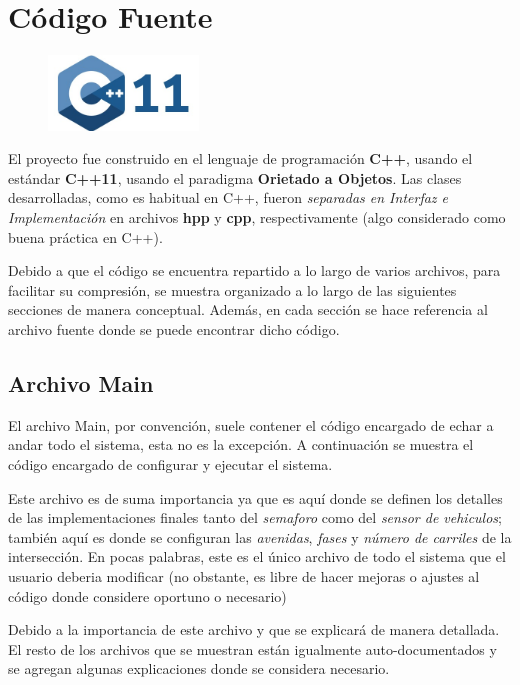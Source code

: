 \documentclass[letterpaper,12pt,openany,oneside]{book}
\begin{document}
\chapter{Código Fuente}\label{chapter:codigofuente}
\begin{figure}
	\includegraphics[width=4cm]{logo_cpp11.jpg}
\end{figure}
El proyecto fue construido en el lenguaje de programación \textbf{C++}, usando el estándar \textbf{C++11}, usando el paradigma \textbf{Orietado a Objetos}. Las clases desarrolladas, como es habitual en C++, fueron \emph{separadas en Interfaz e Implementación} en archivos \textbf{hpp} y \textbf{cpp}, respectivamente (algo considerado como buena práctica en C++).

Debido a que el código se encuentra repartido a lo largo de varios archivos, para facilitar su compresión, se muestra organizado a lo largo de las siguientes secciones de manera conceptual. Además, en cada sección se hace referencia al archivo fuente donde se puede encontrar dicho código.

\section{Archivo Main}
El archivo Main, por convención, suele contener el código encargado de echar a andar todo el sistema, esta no es la excepción. A continuación se muestra el código encargado de configurar y ejecutar el sistema.

Este archivo es de suma importancia ya que es aquí donde se definen los detalles de las implementaciones finales tanto del \emph{semaforo} como del \emph{sensor de vehiculos}; también aquí es donde se configuran las \textit{avenidas}, \textit{fases} y \textit{número de carriles} de la intersección. En pocas palabras, este es el único archivo de todo el sistema que el usuario deberia modificar (no obstante, es libre de hacer mejoras o ajustes al código donde considere oportuno o necesario)

Debido a la importancia de este archivo y que se explicará de manera detallada. El resto de los archivos que se muestran están igualmente auto-documentados y se agregan algunas explicaciones donde se considera necesario.
\end{document}
